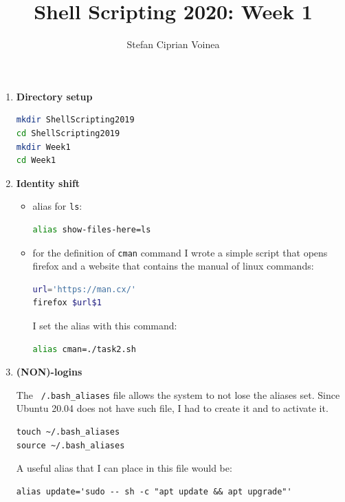 \documentclass[9pt]{article}
\begin{document}
\title{Shell Scripting 2020: Week 1}
\author{Stefan Ciprian Voinea}
\maketitle


\begin{enumerate}
	\item \textbf{Directory setup}
		\begin{lstlisting}[language=bash]
mkdir ShellScripting2019
cd ShellScripting2019
mkdir Week1
cd Week1
		\end{lstlisting}

	\item \textbf{Identity shift}
		\begin{itemize}
			\item alias for \texttt{ls}:
			\begin{lstlisting}[language=bash]
alias show-files-here=ls
			\end{lstlisting}
			\item for the definition of \texttt{cman} command I wrote a simple script that opens firefox and a website that contains the manual of linux commands:
			\begin{lstlisting}[language=bash]
url='https://man.cx/'
firefox $url$1 
			\end{lstlisting}
			I set the alias with this command:
			\begin{lstlisting}[language=bash]
alias cman=./task2.sh
			\end{lstlisting}
		\end{itemize}

	\item \textbf{(NON)-logins}
	
		The \texttt{~/.bash\_aliases} file allows the system to not lose the aliases set.
		Since Ubuntu 20.04 does not have such file, I had to create it and to activate it.
		\begin{lstlisting}
touch ~/.bash_aliases
source ~/.bash_aliases
		\end{lstlisting}
		A useful alias that I can place in this file would be:
		\begin{lstlisting}
alias update='sudo -- sh -c "apt update && apt upgrade"'
		\end{lstlisting}


\end{enumerate}
\end{document}
